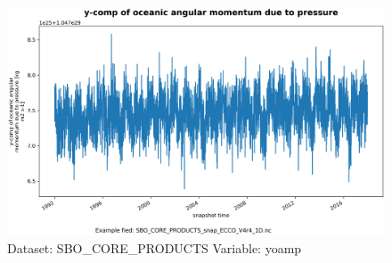\begin{figure}[H]
\centering
\includegraphics[width=\textwidth]{../images/plots/oneD_plots/SBO_Core_Products/yoamp.png}
\caption{Dataset: SBO\_CORE\_PRODUCTS Variable: yoamp}
\label{tab:table-SBO_CORE_PRODUCTS_yoamp-Plot}
\end{figure}
\pagebreak
